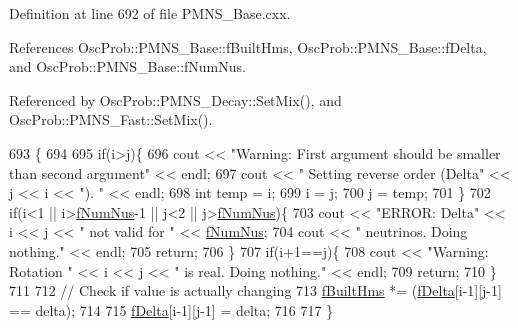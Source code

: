 Definition at line 692 of file P\+M\+N\+S\+\_\+\+Base.\+cxx.



References Osc\+Prob\+::\+P\+M\+N\+S\+\_\+\+Base\+::f\+Built\+Hms, Osc\+Prob\+::\+P\+M\+N\+S\+\_\+\+Base\+::f\+Delta, and Osc\+Prob\+::\+P\+M\+N\+S\+\_\+\+Base\+::f\+Num\+Nus.



Referenced by Osc\+Prob\+::\+P\+M\+N\+S\+\_\+\+Decay\+::\+Set\+Mix(), and Osc\+Prob\+::\+P\+M\+N\+S\+\_\+\+Fast\+::\+Set\+Mix().


\begin{DoxyCode}
693 \{
694 
695   \textcolor{keywordflow}{if}(i>j)\{
696     cout << \textcolor{stringliteral}{"Warning: First argument should be smaller than second argument"} << endl;
697     cout << \textcolor{stringliteral}{"         Setting reverse order (Delta"} << j << i << \textcolor{stringliteral}{"). "} << endl;
698     \textcolor{keywordtype}{int} temp = i;
699     i = j;
700     j = temp;
701   \}
702   \textcolor{keywordflow}{if}(i<1 || i>\hyperlink{classOscProb_1_1PMNS__Base_a24bb74bed63569dfe88b18fa6a08060e}{fNumNus}-1 || j<2 || j>\hyperlink{classOscProb_1_1PMNS__Base_a24bb74bed63569dfe88b18fa6a08060e}{fNumNus})\{
703     cout << \textcolor{stringliteral}{"ERROR: Delta"} << i << j << \textcolor{stringliteral}{" not valid for "} << \hyperlink{classOscProb_1_1PMNS__Base_a24bb74bed63569dfe88b18fa6a08060e}{fNumNus};
704     cout << \textcolor{stringliteral}{" neutrinos. Doing nothing."} << endl;
705     \textcolor{keywordflow}{return};
706   \}
707   \textcolor{keywordflow}{if}(i+1==j)\{
708     cout << \textcolor{stringliteral}{"Warning: Rotation "} << i << j << \textcolor{stringliteral}{" is real. Doing nothing."} << endl;
709     \textcolor{keywordflow}{return};
710   \}
711 
712   \textcolor{comment}{// Check if value is actually changing}
713   \hyperlink{classOscProb_1_1PMNS__Base_a9ac3cadeac8db1b90f3152f476244780}{fBuiltHms} *= (\hyperlink{classOscProb_1_1PMNS__Base_ab2a5fa40e689b221c8a7d2c17213810d}{fDelta}[i-1][j-1] == delta);
714 
715   \hyperlink{classOscProb_1_1PMNS__Base_ab2a5fa40e689b221c8a7d2c17213810d}{fDelta}[i-1][j-1] = delta;
716 
717 \}
\end{DoxyCode}
\mbox{\label{classOscProb_1_1PMNS__Fast_a63733b246e6d2e609ce3de7a65ba5b9f}} 
